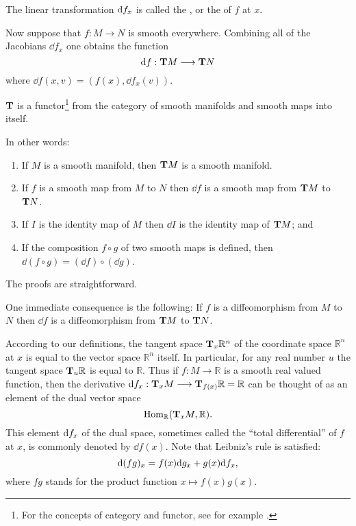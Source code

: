 \documentclass[../main]{subfiles}
\begin{document}
\begin{definition}
The linear transformation $\differential f x$ is called the , or the  of $f$ at $x$. 
\end{definition}

Now suppose that $f : M \longrightarrow N$ is smooth everywhere. Combining all of the Jacobians $\dd f_x$ one obtains the function \[\dd f : \tangentTS M \longrightarrow \tangentTS N\] where $\dd f(x, v) = (f(x), \dd f_x(v))$.

\begin{lemma}
\label{lem:1.4}
$\tangentTS{}$ is a functor\footnote{For the concepts of category and functor, see for example \cite[Chapter IV]{eilenbergsteenrod1952}.} from the category of smooth manifolds and smooth maps into itself. 
\end{lemma}

In other words: 
\begin{enumerate}[label = (\arabic*)]
    \item If $M$ is a smooth manifold, then $\tangentTS M$ is a smooth manifold.
    \item If $f$ is a smooth map from $M$ to $N$ then $\dd f$ is a smooth map from $\tangentTS M$ to $\tangentTS N$.
    \item If $I$ is the identity map of $M$ then $\dd I$ is the identity map of $\tangentTS M$; and
    \item If the composition $f \circ g$ of two smooth maps is defined, then \newline $\dd (f \circ g) = (\dd f) \circ (\dd g)$.
\end{enumerate}

The proofs are straightforward.

One immediate consequence is the following: If $f$ is a diffeomorphism from $M$ to $N$ then $\dd f$ is a diffeomorphism from $\tangentTS M$ to $\tangentTS N$.

\begin{remarks*}
According to our definitions, the tangent space $\tangentspace {{\mathbb R}^n} x$ of the coordinate space ${\mathbb R}^n$ at $x$ is equal to the vector space ${\mathbb R}^n$ itself. In particular, for any real number $u$ the tangent space $\tangentspace {\mathbb R} u$ is equal to $\mathbb R$. Thus if $f : M \longrightarrow \mathbb R$ is a smooth real valued function, then the derivative $\differential f x : \tangentspace M x \longrightarrow \tangentspace {\mathbb R} {f(x)} = \mathbb R$ can be thought of as an element of the dual vector space \[\Hom_{\mathbb R}(\tangentspace M x, \mathbb R).\] This element $\differential f x$ of the dual space, sometimes called the ``total differential'' of $f$ at $x$, is commonly denoted by $\dd f(x)$. Note that Leibniz's rule is satisfied: \[\differential {(fg)} x = f(x) \differential g x + g(x) \differential f x,\] where $f g$ stands for the product function $x \mapsto f(x) g(x)$. 
\end{remarks*}
\end{document}
